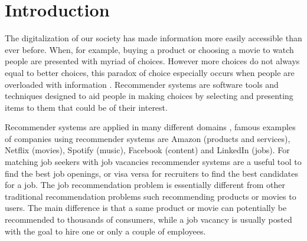 \section{Introduction}
\label{sec:intro}




The digitalization of our society has made information more easily accessible than ever before.
When, for example, buying a product or choosing a movie to watch people are presented with myriad of choices. 
However more choices do not always equal to better choices, this paradox of choice especially occurs when people are overloaded with information \cite{schwartz2004paradox}. 
Recommender systems are software tools and techniques designed to aid people in making choices by selecting and presenting items to them that could be of their interest.

Recommender systems are applied in many different domains \cite{aggarwal2016recommender}, famous examples of companies using recommender systems are Amazon (products and services), Netflix (movies), Spotify (music), Facebook (content) and LinkedIn (jobs).
For matching job seekers with job vacancies recommender systems are a useful tool to find the best job openings, or visa versa for recruiters to find the best candidates for a job.
The job recommendation problem is essentially different from other traditional recommendation problems such recommending products or movies to users.
The main difference is that a same product or movie can potentially be recommended to thousands of consumers, while a job vacancy is usually posted with the goal to hire one or only a couple of employees.

